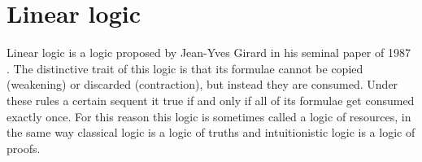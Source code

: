 % 
% 

\section{Linear logic}
Linear logic is a logic proposed by Jean-Yves Girard in his seminal paper of 1987 \cite{LinearLogic}.
The distinctive trait of this logic is that its formulae cannot be copied (weakening) or discarded (contraction), but instead they are consumed.
Under these rules a certain sequent it true if and only if all of its formulae get consumed exactly once.
For this reason this logic is sometimes called a logic of resources, in the same way classical logic is a logic of truths and intuitionistic logic is a logic of proofs.

